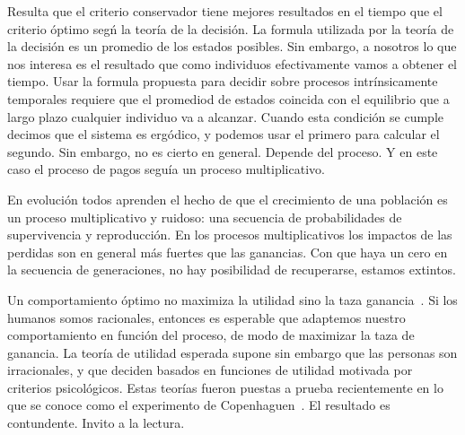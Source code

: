 \documentclass[a4paper,10pt]{article}
\begin{document}
Resulta que el criterio conservador tiene mejores resultados en el tiempo que el criterio \'optimo seg\'n la teor\'ia de la decisi\'on.
La formula utilizada por la teor\'ia de la decisi\'on es un promedio de los estados posibles.
Sin embargo, a nosotros lo que nos interesa es el resultado que como individuos efectivamente vamos a obtener el tiempo.
Usar la formula propuesta para decidir sobre procesos intr\'insicamente temporales requiere que el promediod de estados coincida con el equilibrio que a largo plazo cualquier individuo va a alcanzar.
Cuando esta condici\'on se cumple decimos que el sistema es ergódico, y podemos usar el primero para calcular el segundo.
Sin embargo, no es cierto en general.
Depende del proceso.
Y en este caso el proceso de pagos segu\'ia un proceso multiplicativo.

En evoluci\'on todos aprenden el hecho de que el crecimiento de una poblaci\'on es un proceso multiplicativo y ruidoso: una secuencia de probabilidades de supervivencia y reproducci\'on.
En los procesos multiplicativos los impactos de las perdidas son en general m\'as fuertes que las ganancias.
Con que haya un cero en la secuencia de generaciones, no hay posibilidad de recuperarse, estamos extintos.

Un comportamiento \'optimo no maximiza la utilidad sino la taza ganancia~\cite{peters2019-ergodicityEconomics}.
Si los humanos somos racionales, entonces es esperable que adaptemos nuestro comportamiento en funci\'on del proceso, de modo de maximizar la taza de ganancia.
La teoría de utilidad esperada supone sin embargo que las personas son irracionales, y que deciden basados en funciones de utilidad motivada por criterios psicol\'ogicos.
Estas teor\'ias fueron puestas a prueba recientemente en lo que se conoce como el experimento de Copenhaguen~\cite{meder2019-ergodicityBreaking}.
El resultado es contundente.
Invito a la lectura.

{\scriptsize


}
\end{document}
